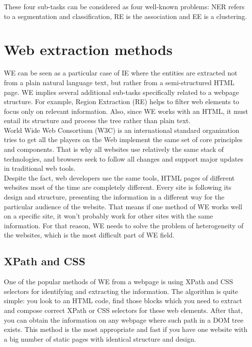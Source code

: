 These four sub-tasks can be considered as four well-known problems: NER refers to a segmentation and classification, RE is the association and EE is a clustering\cite{ManLect}.\\

\section{Web extraction methods}


WE can be seen as a particular case of IE where the entities are extracted not from a plain natural language text, but rather from a semi-structured HTML page. WE implies several additional sub-tasks specifically related to a webpage structure. For example, Region Extraction (RE) helps to filter web elements to focus only on relevant information. Also, since WE works with an HTML, it must entail its structure and process the tree rather than plain text. \\

World Wide Web Consortium (W3C) is an international standard organization tries to get all the players on the Web implement the same set of core principles and components. That is why all websites use relatively the same stack of technologies, and browsers seek to follow all changes and support major updates in traditional web tools.\\

Despite the fact, web developers use the same tools, HTML pages of different websites most of the time are completely different. Every site is following its design and structure, presenting the information in a different way for the particular audience of the website. That means if one method of WE works well on a specific site, it won't probably work for other sites with the same information. For that reason, WE needs to solve the problem of heterogeneity of the websites, which is the most difficult part of WE field.

\subsection{XPath and CSS}

One of the popular methods of WE from a webpage is using XPath and CSS selectors for identifying and extracting the information. The algorithm is quite simple: you look to an HTML code, find those blocks which you need to extract and compose correct XPath or CSS selectors for these web elements. After that, you can obtain the information on any webpage where such path in a DOM tree exists.  This method is the most appropriate and fast if you have one website with a big number of static pages with identical structure and design. \\

